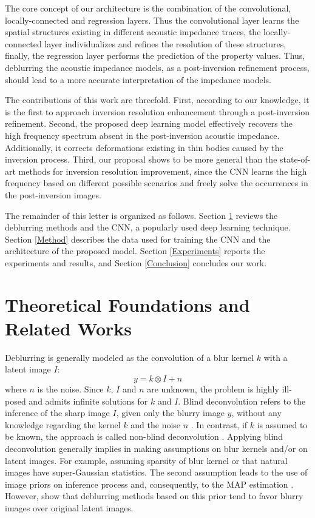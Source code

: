\documentclass[journal]{IEEEtran}
\begin{document}
The core concept of our architecture is the combination of the
convolutional, locally-connected and regression layers. Thus
the convolutional layer learns the spatial structures existing
in different acoustic impedance traces, the locally-connected
layer individualizes and refines the resolution of these structures,
finally, the regression layer performs the prediction of the property values.
Thus, deblurring the acoustic impedance models, as a post-inversion
refinement process, should lead to a more accurate interpretation
of the impedance models.

The contributions of this work are threefold. First,
according to our knowledge, it is the first to approach
inversion resolution enhancement through a post-inversion
refinement. Second, the proposed deep learning model
effectively recovers the high frequency spectrum absent
in the post-inversion acoustic impedance. Additionally, it
corrects deformations existing in thin bodies caused
by the inversion process. Third, our proposal
shows to be more general than the state-of-art
methods for inversion resolution improvement,
since the CNN learns the high frequency
based on different possible scenarios and freely solve
the occurrences in the post-inversion images.

The remainder of this letter is organized as follows.
Section \ref{Theoretics} reviews the deblurring methods
and the CNN, a popularly used deep learning technique.
Section \ref{Method} describes the data used for
training the CNN and the architecture of the proposed model.
Section \ref{Experiments} reports the experiments and
results, and Section \ref{Conclusion} concludes our work.

\section{Theoretical Foundations and Related Works}\label{Theoretics}
Deblurring is generally modeled as the convolution of a blur kernel $k$
with a latent image $I$: 
\begin{equation}
 y = k \otimes I + n
 \label{eq:deblurr}
\end{equation}
where $n$ is the noise. Since $k$, $I$ and $n$ are unknown, the problem 
is highly ill-posed and admits infinite solutions for $k$ and $I$.
Blind deconvolution refers to the inference of the sharp image $I$,
given only the blurry image $y$, without any knowledge regarding the
kernel $k$ and the noise $n$ \cite{Zhang2013}. In contrast, if $k$
is assumed to be known, the approach is called non-blind deconvolution
\cite{Wang2009}.
Applying blind deconvolution generally implies in making assumptions
on blur kernels and/or on latent images. For example, assuming sparsity
of blur kernel or that natural images have super-Gaussian statistics.
The second assumption leads to the use of image priors on inference process
and, consequently, to the MAP estimation
\cite{Babacan2012}. However, \cite{Levin} show that deblurring methods based
on this prior tend to favor blurry images over original latent images.
\end{document}
